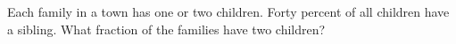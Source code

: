 Each family in a town has one or two children. Forty percent of all children have a sibling. What fraction of the families have two children?
